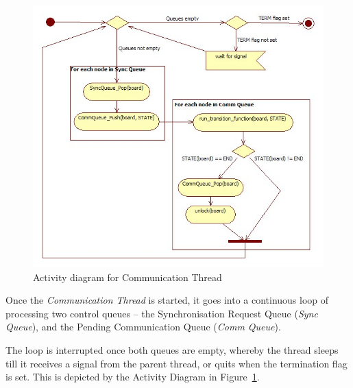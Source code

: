 \begin{figure}[h]
 \centering
  \includegraphics[scale=0.70]{commloop.jpg}
 \caption{Activity diagram for Communication Thread}
 \label{fig:commloop}
\end{figure}

Once the \textit{Communication Thread} is started, it goes into a continuous loop of processing two control queues -- the Synchronisation Request Queue (\textit{Sync Queue}), and the Pending Communication Queue (\textit{Comm Queue}). 

The loop is interrupted once both queues are empty, whereby the thread sleeps till it receives a signal from the parent thread, or quits when the termination flag is set. This is depicted by the Activity Diagram in Figure~\ref{fig:commloop}.



